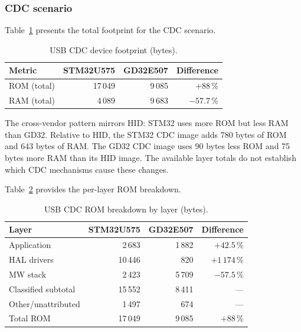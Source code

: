 \subsubsection{CDC scenario}
\label{sec:gd32-usb-cdc}

Table~\ref{tab:gd32-usb-cdc-footprint} presents the total footprint for the CDC scenario.

\begin{table}[H]
  \centering
  \caption{USB CDC device footprint (bytes).}
  \label{tab:gd32-usb-cdc-footprint}
  \begin{tabular}{l r r r}
    \toprule
    \textbf{Metric} & \textbf{STM32U575} & \textbf{GD32E507} & \textbf{Difference} \\
    \midrule
    ROM (total) & 17\,049 & 9\,085  & $+88\,\%$ \\
    RAM (total) & 4\,089  & 9\,683  & $-57.7\,\%$ \\
    \bottomrule
  \end{tabular}
\end{table}

The cross-vendor pattern mirrors HID: STM32 uses more ROM but less RAM than GD32. Relative
to HID, the STM32 CDC image adds 780 bytes of ROM and 643 bytes of RAM. The GD32 CDC image
uses 90 bytes less ROM and 75 bytes more RAM than its HID image. The available layer totals
do not establish which CDC mechanisms cause these changes.

Table~\ref{tab:gd32-usb-cdc-rom} provides the per-layer ROM breakdown.

\begin{table}[H]
  \centering
  \caption{USB CDC ROM breakdown by layer (bytes).}
  \label{tab:gd32-usb-cdc-rom}
  \begin{tabular}{l r r r}
    \toprule
    \textbf{Layer} & \textbf{STM32U575} & \textbf{GD32E507} & \textbf{Difference} \\
    \midrule
    Application    & 2\,683  & 1\,882 & $+42.5\,\%$ \\
    HAL drivers    & 10\,446 & 820    & $+1\,174\,\%$ \\
    MW stack       & 2\,423  & 5\,709 & $-57.5\,\%$ \\
    Classified subtotal & 15\,552 & 8\,411 & --- \\
    Other/unattributed  & 1\,497 & 674 & --- \\
    \midrule
    Total ROM       & 17\,049 & 9\,085 & $+88\,\%$ \\
    \bottomrule
  \end{tabular}
\end{table}

